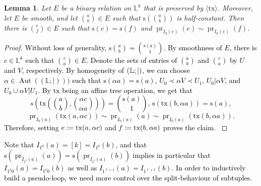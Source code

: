 \documentclass[a4paper,reqno, cleveref]{amsart}
\newcommand{\coloneqq}{\mathrel{\mathop:}\mathrel{\mkern-1.2mu}=}
\newtheorem{lemma}[theorem]{Lemma}
\newcommand{\struct}[1]{\mathbb{#1}}
\newcommand{\s}{\ensuremath{\mathrm{s}}\xspace}
\DeclareMathOperator{\pr}{pr}
\DeclareMathOperator{\Aut}{Aut}
\newcommand{\sL}{\mathbb L}
\newcommand{\bin}{E}
\newcommand{\gen}[1]{\langle#1\rangle}
\newcommand{\Phylo}[1]{\ensuremath{(\struct{L};|)}#1}
\newcommand{\tx}{\ensuremath{\mathrm{tx}}\xspace}
\newcommand\jo[1]{\textcolor{black}{#1}} %
\newcommand\mo[1]{\textcolor{black}{#1}} %
\begin{document}
\begin{lemma}\label{phylo:lemma:graph:even}%
    Let $\bin$ be a binary relation on $\sL^k$ that is preserved by $\gen{\tx}$. Moreover, let $\bin$ be smooth, and let $\binom{a}{b}\in\bin$ such that $\s(\binom{a}{b})$ is half-constant.
    Then there is $\binom{e}{f}\in \bin$ such that $\s(e)=\s(f)$ and $\pr_{I_0(e)}(e)\sim \pr_{I_0(e)}(f)$.
\end{lemma}
\begin{proof}
    \mo{Without loss of generality, $\s\binom{a}{b}=\binom{\s(a)}{1}$. 
    By smoothness of $E$, there is $c\in \sL^k$ such that $\binom{c}{a}\in\bin$. 
    Denote the sets of entries of $\binom{a}{b}$ and $\binom{c}{a}$ by $U$ and $V$, respectively.
    By homogeneity of $\Phylo$, we can choose $\alpha\in\Aut(\Phylo))$ such that 
    $\s(\alpha a)=\s(a)$,
    $U_0\prec \alpha V\prec U_1$, $U_0|\alpha V$, and $U_0\cup \alpha V| U_1$.}
    \mo{By $\tx$ being an affine tree operation, we get that 
    \[s\left(\tx\left(\binom{a}{b},\binom{\alpha c}{\alpha a}\right)\right)=\binom{\s(a)}{1},\, \s(\tx(b,\alpha a))=\s(a),\]
    \text{ and } 
    \[\pr_{I_0(a)}(\tx(a,\alpha c))\sim\pr_{I_0(a)}(a)\sim\pr_{I_0(a)}(\tx(b,\alpha a)).\]
    Therefore, setting $e\coloneqq\tx(a,\alpha c)$ and $f\coloneqq\tx(b,\alpha a)$ proves the claim. 
    }
    



\end{proof}

\jo{Note that $I_{1^0}(a)=[k]=I_{1^0}(b)$, and that $\s(\pr_{I_{1^\ell}(a)}(a))=\s(\pr_{I_{1^\ell}(a)}(b))$ implies in particular that $I_{1^{\ell}0}(a)=I_{1^{\ell}0}(b)$ as well as $I_{1^{\ell+1}}(a)=I_{1^{\ell+1}}(b)$. In order to inductively build a pseudo-loop, we need more control over the split-behaviour of subtuples. }
\end{document}

